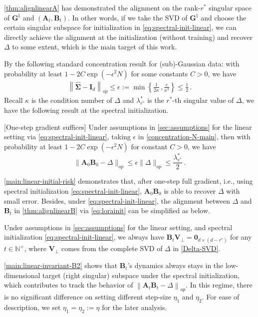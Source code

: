 \cref{thm:alignlinearA} has demonstrated the alignment on the rank-$r^*$ singular space of $\bm G^{\natural}$ and $(\bm A_t, \bm B_t)$.
In other words, if we take the SVD of $\bm G^{\natural}$ and choose the certain singular subspace for initialization in \eqref{eq:spectral-init-linear}, we can directly achieve the alignment at the initialization (without training) and recover $\Delta$ to some extent, which is the main target of this work.

By the following standard concentration result for (sub)-Gaussian data:
with probability at least $1-2C\exp(-\epsilon^2 N)$ for some constants $C>0$, we have
\begin{align}
\label{concentration-N-main}
    \left\|\widehat{\bm \Sigma} - \bm I_d\right\|_{op} \leq \epsilon:= \min\left\{\frac{1}{2\kappa}\,,\frac{c}{\kappa^3}\right\} \leq \frac{1}{2} \,.
\end{align}
Recall $\kappa$ is the condition number of $\Delta$ and $\lambda_{r^*}^*$ is the $r^*$-th singular value of $\Delta$, we have the following result at the spectral initialization.
\begin{proposition}
\label{main:linear-initial-risk}[One-step gradient suffices]
    Under assumptions in \cref{sec:assumptions} for the linear setting via \eqref{eq:spectral-init-linear}, taking $\epsilon$ in \cref{concentration-N-main}, then with probability at least $1-2C\exp(-\epsilon^2 N )$ for constant $C>0$, we have
    \begin{equation*}
        \| \bm A_0 \bm B_0 - \Delta \|_{op} \leq \epsilon \| \Delta \|_{op} \leq \frac{\lambda_{r^*}^*}{2} \,.
    \end{equation*}
\end{proposition}
\cref{main:linear-initial-risk} demonstrates that, after one-step full gradient, i.e., using spectral initialization \eqref{eq:spectral-init-linear}, $\bm A_0 \bm B_0$ is able to recover $\Delta$ with small error.
Besides, under \eqref{eq:spectral-init-linear}, the alignment between $\Delta$ and $\bm B_t$ in \cref{thm:alignlinearB} via \eqref{eq:lorainit} can be simplified as below.
\begin{lemma}
\label{main:linear-invariant-B2}
   Under assumptions in \cref{sec:assumptions} for the linear setting, and spectral initialization \eqref{eq:spectral-init-linear}, we always have $\bm B_t \bm V_\perp = \bm 0_{d\times (d-r^*)}$ for any $t\in\mathbb{N}^{+}$, where $\bm V_\perp$ comes from the complete SVD of $\Delta$ in \cref{Delta-SVD}.
\end{lemma}
\cref{main:linear-invariant-B2} shows that $\bm B_t$'s dynamics always stays in the low-dimensional target (right singular) subspace under the spectral initialization, which contributes to track the behavior of $\left\|\bm A_t \bm B_t - \Delta\right\|_{op}$. In this regime, there is no significant difference on setting different step-size $\eta_1$ and $\eta_2$. For ease of description, we set $\eta_1=\eta_2 := \eta$ for the later analysis.
